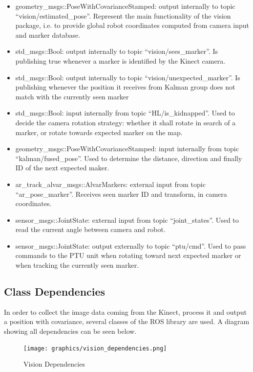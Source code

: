 \begin{itemize}
\item geometry\_msgs::PoseWithCovarianceStamped: output internally to topic “vision/estimated\_pose”. Represent the main functionality of the vision package, i.e. to provide global robot coordinates computed from camera input and marker database.
\item std\_msgs::Bool: output internally to topic “vision/sees\_marker”. Is publishing true whenever a marker is identified by the Kinect camera.
\item std\_msgs::Bool: output internally to topic “vision/unexpected\_marker”. Is publishing whenever the position it receives from Kalman group does not match with the currently seen marker
\item std\_msgs::Bool: input internally from topic “HL/is\_kidnapped”. Used to decide the camera rotation strategy: whether it shall rotate in search of a marker, or rotate towards expected marker on the map.
\item geometry\_msgs::PoseWithCovarianceStamped: input internally from topic “kalman/fused\_pose”. Used to determine the distance, direction and finally ID of the next expected maker.
\item ar\_track\_alvar\_msgs::AlvarMarkers: external input from topic “ar\_pose\_marker”. Receives seen marker ID and transform, in camera coordinates.
\item sensor\_msgs::JointState: external input from topic “joint\_states”. Used to read the current angle between camera and robot.
\item sensor\_msgs::JointState: output externally to topic “ptu/cmd”. Used to pass commands to the PTU unit when rotating toward next expected marker or when tracking the currently seen marker.
\end{itemize}

\subsection{Class Dependencies}
In order to collect the image data coming from the Kinect, process it and output a position with covariance, several classes of the ROS library are used. A diagram showing all dependencies can be seen below.

\begin{figure}
\begin{center}
\texttt{[image: graphics/vision\_dependencies.png]}
\caption{Vision Dependencies}
\label{Class dependencies inside Vision Package}
\end{center}
\end{figure}

